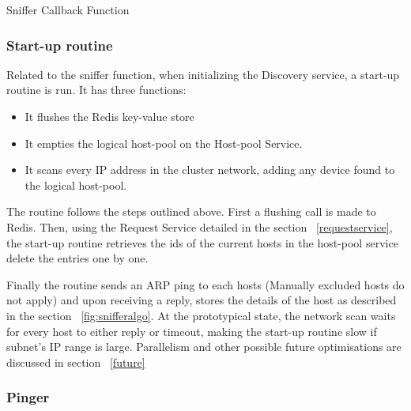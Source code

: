 \begin{center}
\begin{algorithm}[H]
\label{fig:snifferalgo}
\begin{center}
\end{center}
\caption{Sniffer Callback Function}
\end{algorithm}
\end{center}

\subsubsection{Start-up routine} \label{startup}

Related to the sniffer function, when initializing the Discovery service, a start-up routine is run. It has three functions:

\begin{itemize}
\item It flushes the Redis key-value store
\item It empties the logical host-pool on the Host-pool Service.
\item It scans every IP address in the cluster network, adding any device found to the logical host-pool.
\end{itemize}

The routine follows the steps outlined above. First a flushing call is made to Redis. Then, using the Request Service detailed in the section ~\ref{requestservice}, the start-up routine retrieves the ids of the current hosts in the host-pool service delete the entries one by one.

Finally the routine sends an ARP ping to each hosts (Manually excluded hosts do not apply) and upon receiving a reply, stores the details of the host as described in the section ~\ref{fig:snifferalgo}. At the prototypical state, the network scan waits for every host to either reply or timeout, making the start-up routine slow if subnet's IP range is large. Parallelism and other possible future optimisations are discussed in section ~\ref{future}

\subsubsection{Pinger} \label{pinger}


